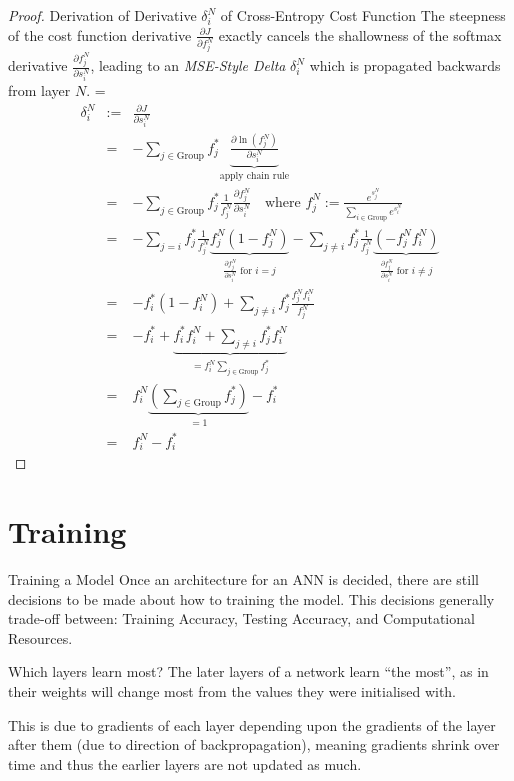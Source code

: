 \documentclass[11pt,a4paper]{article}
\begin{document}
  \begin{proof}{Derivation of Derivative $\delta_i^N$ of Cross-Entropy Cost Function}
    The steepness of the cost function derivative $\frac{\partial J}{\partial f_j^N}$ exactly cancels the shallowness of the softmax derivative $\frac{\partial f_j^N}{\partial s_i^N}$, leading to an \textit{MSE-Style Delta} $\delta_i^N$ which is propagated backwards from layer $N$.
    \everymath={\displaystyle}
    \[\begin{array}{rrl}
      \delta_i^N&:=&\frac{\partial J}{\partial s_i^N}\\
      &=&-\sum_{j\in\text{Group}}f_j^*\underbrace{\frac{\partial \ln(f_j^N)}{\partial s_i^N}}_\text{apply chain rule}\\
      &=&-\sum_{j\in\text{Group}}f_j^*\frac1{f_j^N}\frac{\partial f_j^N}{\partial s_i^N}\quad\text{where }f_j^N:=\frac{e^{s_j^N}}{\sum_{i\in\text{Group}}e^{s_i^N}}\\
      &=&-\sum_{j=i}f_j^*\frac1{f_j^N}\underbrace{f_j^N(1-f_j^N)}_{\frac{\partial f_j^N}{\partial s_i^N}\text{ for }i=j}-\sum_{j\neq i}f_j^*\frac1{f_j^N}\underbrace{(-f_j^Nf_i^N)}_{\frac{\partial f_j^N}{\partial s_i^N}\text{ for }i\neq j}\\
      &=&-f_i^*(1-f_i^N)+\sum_{j\neq i}f_j^*\frac{f_j^Nf_i^N}{f_j^N}\\
      &=&-f_i^*+\underbrace{f_i^*f_i^N+\sum_{j\neq i}f_j^*f_i^N}_{=f_i^N\sum_{j\in\text{Group}}f_j^*}\\
      &=&f_i^N\underbrace{\left(\sum_{j\in\text{Group}}f_j^*\right)}_{=1}-f_i^*\\
      &=&f_i^N-f_i^*
    \end{array}\]
  \end{proof}

\section{Training} \label{sec_Training}

  \begin{remark}{Training a Model}
    Once an architecture for an ANN is decided, there are still decisions to be made about how to training the model. This decisions generally trade-off between: Training Accuracy, Testing Accuracy, and Computational Resources.
  \end{remark}

  \begin{remark}{Which layers learn most?}
    The later layers of a network learn ``the most'', as in their weights will change most from the values they were initialised with.
    \par This is due to gradients of each layer depending upon the gradients of the layer after them (due to direction of backpropagation), meaning gradients shrink over time and thus the earlier layers are not updated as much.
  \end{remark}
\end{document}
